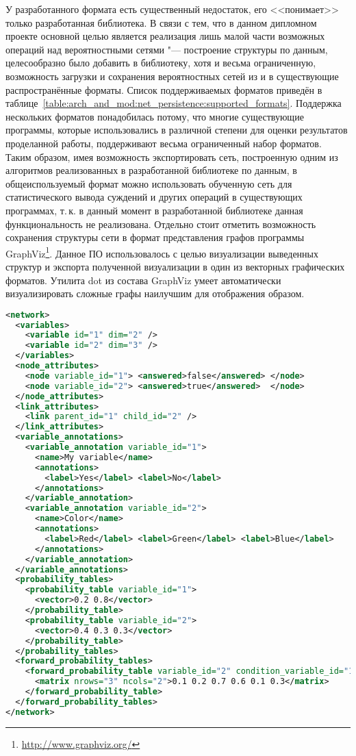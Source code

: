 У разработанного формата есть существенный недостаток, его <<понимает>> только разработанная библиотека.
В связи с тем, что в данном дипломном проекте основной целью является реализация лишь малой части возможных операций над вероятностными сетями "--- построение структуры по данным, целесообразно было добавить в библиотеку, хотя и весьма ограниченную, возможность загрузки и сохранения вероятностных сетей из и в существующие распространённые форматы.
Список поддерживаемых форматов приведён в таблице~\ref{table:arch_and_mod:net_persistence:supported_formats}.
Поддержка нескольких форматов понадобилась потому, что многие существующие программы, которые использовались в различной степени для оценки результатов проделанной работы, поддерживают весьма ограниченный набор форматов.
Таким образом, имея возможность экспортировать сеть, построенную одним из алгоритмов реализованных в разработанной библиотеке по данным, в общеиспользуемый формат можно использовать обученную сеть для статистического вывода суждений и других операций в существующих программах, т.\,к. в данный момент в разработанной библиотеке данная функциональность не реализована.
Отдельно стоит отметить возможность сохранения структуры сети в формат представления графов программы GraphViz\footnote{\url{http://www.graphviz.org/}}.
Данное ПО использовалось с целью визуализации выведенных структур и экспорта полученной визуализации в один из векторных графических форматов.
Утилита dot из состава GraphViz умеет автоматически визуализировать сложные графы наилучшим для отображения образом.

\clearpage
\begin{lstlisting}[language=XML,caption={Пример представления простой вероятностной сети в собственном XML"=формате}, label=lst:arch_and_mod:net_persistence:bnxml]
<network>
  <variables>
    <variable id="1" dim="2" />
    <variable id="2" dim="3" />
  </variables>
  <node_attributes>
    <node variable_id="1"> <answered>false</answered> </node>
    <node variable_id="2"> <answered>true</answered>  </node>
  </node_attributes> 
  <link_attributes>
    <link parent_id="1" child_id="2" />
  </link_attributes>
  <variable_annotations>
    <variable_annotation variable_id="1">
      <name>My variable</name>
      <annotations>
        <label>Yes</label> <label>No</label>
      </annotations>
    </variable_annotation>
    <variable_annotation variable_id="2">
      <name>Color</name>
      <annotations>
        <label>Red</label> <label>Green</label> <label>Blue</label>
      </annotations>
    </variable_annotation>
  </variable_annotations>
  <probability_tables>
    <probability_table variable_id="1">
      <vector>0.2 0.8</vector>
    </probability_table>
    <probability_table variable_id="2">
      <vector>0.4 0.3 0.3</vector>
    </probability_table>
  </probability_tables>
  <forward_probability_tables>
    <forward_probability_table variable_id="2" condition_variable_id="1">
      <matrix nrows="3" ncols="2">0.1 0.2 0.7 0.6 0.1 0.3</matrix>
    </forward_probability_table>
  </forward_probability_tables>
</network>
\end{lstlisting}

